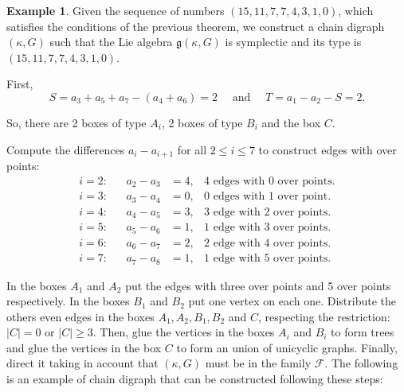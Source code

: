 \documentclass[a4paper,11pt]{amsart}
\theoremstyle{definition}
\newtheorem{example}[theorem]{Example}
\theoremstyle{remark}
\numberwithin{equation}{section}
\newcommand{\g}{\mathfrak{g}}
\begin{document}
\begin{example}
 Given the sequence of numbers $(15,11,7,7,4,3,1,0)$, 
 which satisfies the conditions of the previous theorem, we construct a chain digraph \((\kappa,G)\) such that the Lie algebra \(\g(\kappa,G)\) is symplectic and its type is $(15,11,7,7,4,3,1,0)$.
 
 First,
\[S=a_3+a_5+a_7-(a_4+a_6)=2 \quad \text{ and } \quad T=a_1-a_2-S=2.\]

So, there are 2 boxes of type \(A_i\), 2 boxes of type \(B_i\) and the box \(C\).

Compute the differences $a_i - a_{i+1}$ for all $2\leq i\leq 7$ to construct edges with over points:
\begin{align*}
i=2:& & a_2-a_3 &= 4, &\text{4 edges with 0 over points.}\\
i=3:& & a_3 - a_4 &= 0, &\text{0 edges with 1 over point.} \\
i=4:& &a_4 - a_5 &= 3, &\text{3 edge with 2 over points.}\\
i=5:& &a_5 - a_6 &= 1, &\text{1 edge with 3 over points.}\\
i=6:& &a_6 - a_7 &= 2, &\text{2 edge with 4 over points.}\\
i=7:& &a_7 - a_8 &= 1, &\text{1 edge with 5 over points.}
\end{align*}

In the boxes \(A_1\) and \(A_2\) put the edges with three over points and 5 over points respectively. In the boxes \(B_1\) and \(B_2\) put one vertex on each one. Distribute the others even edges in the boxes \(A_1, A_2, B_1, B_2\) and \(C\), respecting the restriction: \(|C|=0\) or \(|C|\ge 3\). Then, glue the vertices in the boxes \(A_i\) and \(B_i\) to form trees and glue the vertices in the box \(C\) to form an union of unicyclic graphs. Finally, direct it taking in account that \((\kappa,G)\) must be in the family \(\mathcal{F}\). The following is an example of chain digraph that can be constructed following these steps:

\begin{center}
\end{center}
\end{example}
\end{document}
